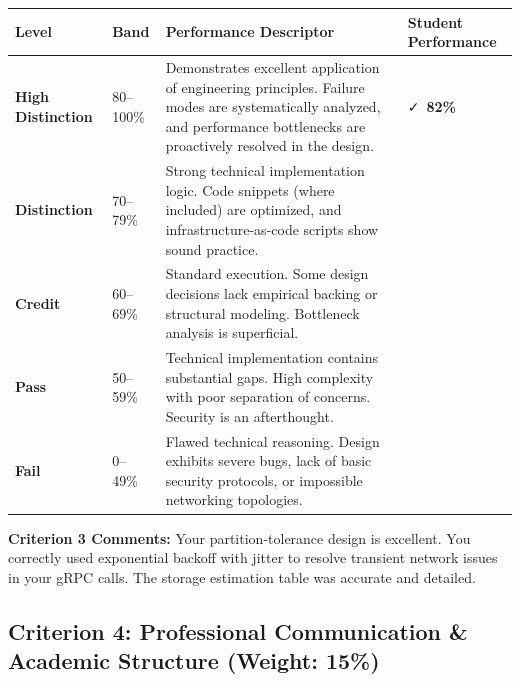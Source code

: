 \noindent
\begin{tabularx}{\textwidth}{@{} >{\bfseries}l p{1.8cm} X >{\centering\arraybackslash}p{1.6cm} @{}}
\toprule
Level & Band & Performance Descriptor & Student Performance \\
\midrule
High Distinction & 80--100\% & Demonstrates excellent application of engineering principles. Failure modes are systematically analyzed, and performance bottlenecks are proactively resolved in the design. & \cellcolor{success!10}\faCheck\ \textbf{82\%} \\
\midrule
Distinction & 70--79\% & Strong technical implementation logic. Code snippets (where included) are optimized, and infrastructure-as-code scripts show sound practice. & \\
\midrule
Credit & 60--69\% & Standard execution. Some design decisions lack empirical backing or structural modeling. Bottleneck analysis is superficial. & \\
\midrule
Pass & 50--59\% & Technical implementation contains substantial gaps. High complexity with poor separation of concerns. Security is an afterthought. & \\
\midrule
Fail & 0--49\% & Flawed technical reasoning. Design exhibits severe bugs, lack of basic security protocols, or impossible networking topologies. & \\
\bottomrule
\end{tabularx}

\vspace{0.8em}
\begin{tcolorbox}[colback=lightbg, colframe=bordercolor, arc=2pt, left=8pt, right=8pt, top=6pt, bottom=6pt]
\small \textbf{Criterion 3 Comments:} Your partition-tolerance design is excellent. You correctly used exponential backoff with jitter to resolve transient network issues in your gRPC calls. The storage estimation table was accurate and detailed.
\end{tcolorbox}

\vspace{2.2em}

\subsection*{Criterion 4: Professional Communication \& Academic Structure (Weight: 15\%)}

